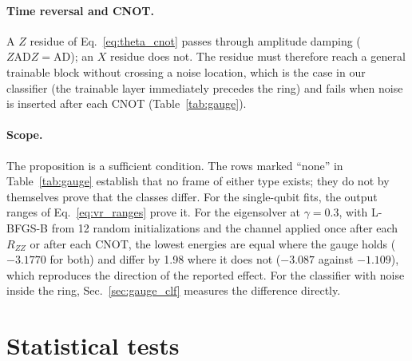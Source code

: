 \documentclass[
 aps,pra,
 twocolumn,
 superscriptaddress,
 longbibliography,
 nofootinbib
]{revtex4-2}
\newcommand{\AD}{\mathrm{AD}}
\begin{document}
\paragraph{Time reversal and CNOT.}
A $Z$ residue of Eq.~\eqref{eq:theta_cnot}
passes through amplitude damping ($Z\AD Z=\AD$); an $X$ residue does not. The residue must
therefore reach a general trainable block without crossing a noise location, which is the
case in our classifier (the trainable layer immediately precedes the ring) and fails when
noise is inserted after each CNOT (Table~\ref{tab:gauge}).

\paragraph{Scope.}
The proposition is a sufficient condition. The rows marked ``none'' in
Table~\ref{tab:gauge} establish that no frame of either type exists; they do not by
themselves prove that the classes differ. For the single-qubit fits, the output
ranges of Eq.~\eqref{eq:vr_ranges} prove it. For the eigensolver at $\gamma=0.3$, with L-BFGS-B
from 12 random initializations and the channel applied once after each
$R_{ZZ}$ or after each CNOT, the lowest energies are equal where the gauge
holds ($-3.1770$ for both) and differ by 1.98 where it does not ($-3.087$
against $-1.109$), which reproduces the direction of the reported effect. For the
classifier with noise inside the
ring, Sec.~\ref{sec:gauge_clf} measures the difference directly.

\section{Statistical tests}
\label{app:stats}
\end{document}
